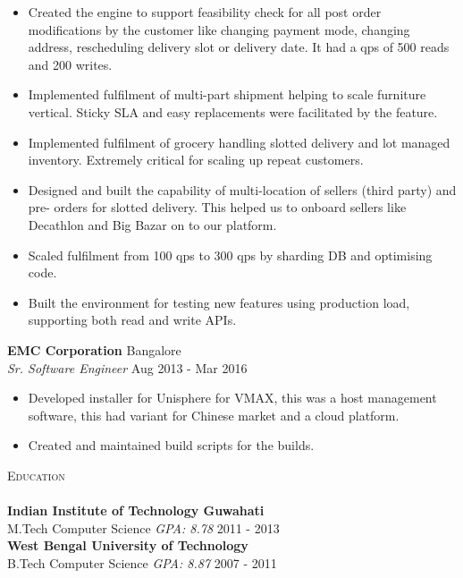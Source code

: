 \documentclass[a4paper]{article}
\newcommand{\lineunder} {
    \vspace*{-8pt} \\
    \hspace*{-18pt} \hrulefill \\
}
\newcommand{\header} [1] {
    {\hspace*{-18pt}\vspace*{6pt} \textsc{#1}}
    \vspace*{-6pt} \lineunder
}
\begin{document}
\vspace{-1mm}
\begin{itemize} \itemsep 1pt
	\item Created the engine to support feasibility check for all post order modifications by the customer like changing payment mode, changing address, rescheduling delivery slot or delivery date. It had a qps of 500 reads and 200 writes.
	\item Implemented fulfilment of multi-part shipment helping to scale furniture vertical. Sticky SLA and easy replacements were facilitated by the feature.
	\item Implemented fulfilment of grocery handling slotted delivery and lot managed inventory. Extremely critical for scaling up repeat customers.
	\item Designed and built the capability of multi-location of sellers (third party) and pre- orders for slotted delivery. This helped us to onboard sellers like Decathlon and Big Bazar on to our platform.
	\item Scaled fulfilment from 100 qps to 300 qps by sharding DB and optimising code.
	\item Built the environment for testing new features using production load, supporting both read and write APIs.
\end{itemize}
\textbf{EMC Corporation} \hfill Bangalore\\
\textit{Sr. Software Engineer} \hfill Aug 2013 - Mar 2016\\
\vspace{-1mm}
\begin{itemize} \itemsep 1pt
	\item Developed installer for Unisphere for VMAX, this was a host management software, this had variant for Chinese market and a cloud platform.
	\item Created and maintained build scripts for the builds.
\end{itemize}

\header{Education}
\textbf{Indian Institute of Technology Guwahati}\\
M.Tech Computer Science \textit{GPA: 8.78} \hfill 2011 - 2013\\
\vspace{2mm}
\textbf{West Bengal University of Technology}\\
B.Tech Computer Science \textit{GPA: 8.87} \hfill 2007 - 2011\\
\vspace{2mm}
\end{document}
